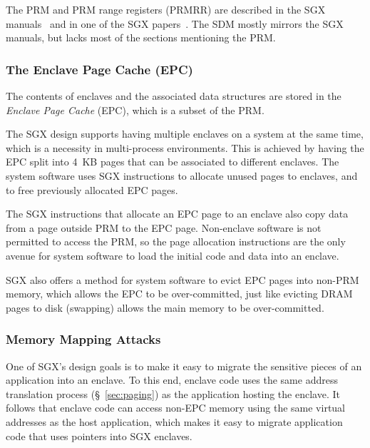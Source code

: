 The PRM and PRM range registers (PRMRR) are described in the SGX
manuals~\cite{intel2013sgxmanual, intel2014sgx2manual} and in one of the SGX
papers~\cite{mckeen2013sgx}. The SDM mostly mirrors the SGX manuals, but lacks
most of the sections mentioning the PRM.


\subsubsection{The Enclave Page Cache (EPC)}
\label{sec:epc}


The contents of enclaves and the associated data structures are stored in the
\textit{Enclave Page Cache} (EPC), which is a subset of the PRM.

The SGX design supports having multiple enclaves on a system at the same time,
which is a  necessity in multi-process environments. This is achieved by having
the EPC split into 4~KB pages that can be associated to different enclaves. The
system software uses SGX instructions to allocate unused pages to enclaves, and
to free previously allocated EPC pages.

The SGX instructions that allocate an EPC page to an enclave also copy data
from a page outside PRM to the EPC page. Non-enclave software is not permitted
to access the PRM, so the page allocation instructions are the only avenue for
system software to load the initial code and data into an enclave.

SGX also offers a method for system software to evict EPC pages into non-PRM
memory, which allows the EPC to be over-committed, just like evicting DRAM
pages to disk (swapping) allows the main memory to be over-committed.


\subsubsection{Memory Mapping Attacks}
\label{sec:mapping_attacks}


One of SGX's design goals is to make it easy to migrate the sensitive pieces of
an application into an enclave. To this end, enclave code uses the same address
translation process (\S~\ref{sec:paging}) as the application hosting the
enclave. It follows that enclave code can access non-EPC memory using the same
virtual addresses as the host application, which makes it easy to migrate
application code that uses pointers into SGX enclaves.


